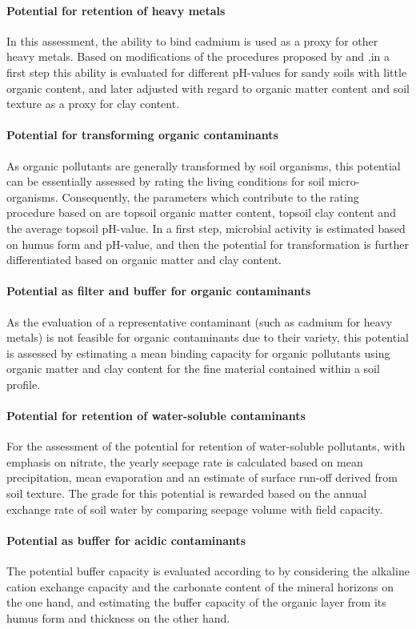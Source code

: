 \documentclass[soilsystems,article,submit,moreauthors,pdftex,10pt,a4paper]{Definitions/mdpi}
\begin{document}
\paragraph{Potential for retention of heavy metals}
In this assessment, the ability to bind cadmium is used as a proxy for other heavy metals. Based on modifications of the procedures proposed by \cite{AGBoden2000} and \cite{BAYGLA2003},in a first step this ability is evaluated for different pH-values for sandy soils with little organic content, and later adjusted with regard to organic matter content and soil texture as a proxy for clay content.
\paragraph{Potential for transforming organic contaminants}
As organic pollutants are generally transformed by soil organisms, this potential can be essentially assessed by rating the living conditions for soil micro-organisms. Consequently, the parameters which contribute to the rating procedure based on \cite{LUBW1995}  are topsoil organic matter content, topsoil clay content and the average topsoil pH-value. In a first step, microbial activity is estimated based on humus form and pH-value, and then the potential for transformation is further differentiated based on organic matter and clay content.
\paragraph{Potential as  filter and buffer for organic contaminants}
As the evaluation of a representative contaminant (such as cadmium for heavy metals) is not feasible for organic contaminants due to their variety, this potential is assessed by estimating a mean binding capacity for organic pollutants using organic matter and clay content for the fine material contained within a soil profile.
\paragraph{Potential for retention of water-soluble contaminants}
For the assessment of the potential for retention of water-soluble pollutants, with emphasis on nitrate, the yearly seepage rate is calculated based on mean precipitation, mean evaporation and an estimate of surface run-off derived from soil texture. The grade for this potential is rewarded based on the annual exchange rate of soil water by comparing seepage volume with field capacity.
\paragraph{Potential as buffer for acidic contaminants}
The potential buffer capacity is evaluated according to \cite{BAYGLA2003} by considering the alkaline cation exchange capacity and the carbonate content of the mineral horizons on the one hand, and estimating the buffer capacity of the organic layer from its humus form and thickness on the other hand.
\end{document}
